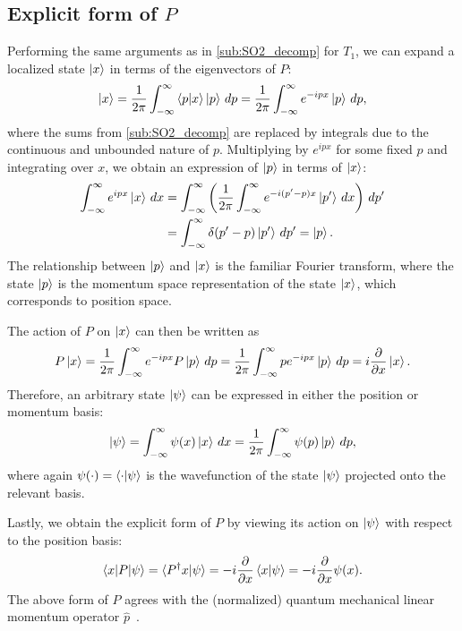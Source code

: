 \subsection{Explicit form of $P$}\label{sub:explicit_P}

Performing the same arguments as in \cref{sub:SO2_decomp} for $T_1$, we can expand a localized state $\ket{x}$  in terms of the eigenvectors of $P$:
\begin{align*}
    \ket{x} = \frac{1}{2\pi}\int_{-\infty}^{\infty} \braket{p|x}\ket{p} \,dp = \frac{1}{2\pi}\int_{-\infty}^{\infty} e^{-ipx}\ket{p} \,dp,
\end{align*}
where the sums from \cref{sub:SO2_decomp} are replaced by integrals due to the continuous and unbounded nature of $p$. Multiplying by $e^{ipx}$ for some fixed $p$ and integrating over $x$, we obtain an expression of $\ket{p}$ in terms of $\ket{x}$:
\begin{align*}
    \int_{-\infty}^{\infty} e^{ipx}\ket{x} \,dx
        &= \int_{-\infty}^{\infty} \left(\frac{1}{2\pi} \int_{-\infty}^{\infty} e^{-i(p'-p)x}\ket{p'} \,dx \right)\,dp' \\
        &= \int_{-\infty}^{\infty} \delta(p'-p) \ket{p'} \,dp' = \ket{p}.
\end{align*}
The relationship between $\ket{p}$ and $\ket{x}$ is the familiar Fourier transform, where the state $\ket{p}$ is the momentum space representation of the state $\ket{x}$, which corresponds to position space.

The action of $P$ on $\ket{x}$ can then be written as
\begin{align*}
    P\ket{x} = \frac{1}{2\pi}\int_{-\infty}^{\infty} e^{-ipx}P\ket{p} \,dp = \frac{1}{2\pi}\int_{-\infty}^{\infty} p e^{-ipx}\ket{p} \,dp = i\frac{\partial}{\partial x}\ket{x}.
\end{align*}
Therefore, an arbitrary state $\ket{\psi}$ can be expressed in either the position or momentum basis:
\begin{align*}
    \ket{\psi} = \int_{-\infty}^{\infty} \psi(x)\ket{x} \,dx = \frac{1}{2\pi}\int_{-\infty}^{\infty} \psi(p)\ket{p} \,dp,
\end{align*}
where again $\psi(\cdot) = \braket{\cdot|\psi}$ is the wavefunction of the state $\ket{\psi}$ projected onto the relevant basis.

Lastly, we obtain the explicit form of $P$ by viewing its action on $\ket{\psi}$ with respect to the position basis:
\begin{align*}
    \braket{x|P|\psi} = \braket{P^\dagger x|\psi} = -i\frac{\partial}{\partial x}\braket{x|\psi} = -i\frac{\partial}{\partial x}\psi(x).
\end{align*}
The above form of $P$ agrees with the (normalized) quantum mechanical linear momentum operator $\hat{p}$~\cite{Hall2013,Griffiths2018}.

